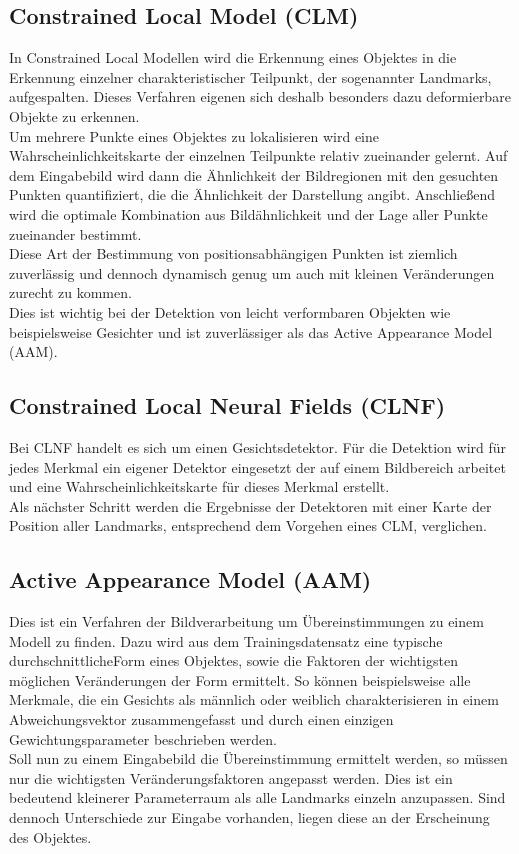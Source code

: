\subsection{Constrained Local Model (CLM)}
In Constrained Local Modellen wird die Erkennung eines Objektes in die Erkennung einzelner charakteristischer Teilpunkt, der sogenannter Landmarks, aufgespalten. Dieses Verfahren eigenen sich deshalb besonders dazu deformierbare Objekte zu erkennen.\\
Um mehrere Punkte eines Objektes zu lokalisieren wird eine Wahrscheinlichkeitskarte der einzelnen Teilpunkte relativ zueinander gelernt. Auf dem Eingabebild wird dann die Ähnlichkeit der Bildregionen mit den gesuchten Punkten quantifiziert, die die Ähnlichkeit der Darstellung angibt. Anschließend wird die optimale Kombination aus Bildähnlichkeit und der Lage aller Punkte zueinander bestimmt.\\
Diese Art der Bestimmung von positionsabhängigen Punkten ist ziemlich zuverlässig und dennoch dynamisch genug um auch mit kleinen Veränderungen zurecht zu kommen.\\
Dies ist wichtig bei der Detektion von leicht verformbaren Objekten wie beispielsweise Gesichter und ist zuverlässiger als das Active Appearance Model (AAM).
\cite{pdf_CLM}
\subsection{Constrained Local Neural Fields (CLNF)}
Bei CLNF handelt es sich um einen Gesichtsdetektor. Für die Detektion wird für jedes Merkmal ein eigener Detektor eingesetzt der auf einem Bildbereich arbeitet und eine Wahrscheinlichkeitskarte für dieses Merkmal erstellt.\\
Als nächster Schritt werden die Ergebnisse der Detektoren mit einer Karte der Position aller Landmarks, entsprechend dem Vorgehen eines CLM, verglichen.
\cite{CLNF}
\subsection{Active Appearance Model (AAM)}
Dies ist ein Verfahren der Bildverarbeitung um Übereinstimmungen zu einem Modell zu finden. Dazu wird aus dem Trainingsdatensatz eine typische \glqq durchschnittliche\grqq Form eines Objektes, sowie die Faktoren der wichtigsten möglichen Veränderungen der Form ermittelt. So können beispielsweise alle Merkmale, die ein Gesichts als männlich oder weiblich charakterisieren in einem Abweichungsvektor zusammengefasst und durch einen einzigen Gewichtungsparameter beschrieben werden.\\
Soll nun zu einem Eingabebild die Übereinstimmung ermittelt werden, so müssen nur die wichtigsten Veränderungsfaktoren angepasst werden. Dies ist ein bedeutend kleinerer Parameterraum als alle Landmarks einzeln anzupassen. Sind dennoch Unterschiede zur Eingabe vorhanden, liegen diese an der Erscheinung des Objektes.
\cite{wiki_AAM}
\newpage
